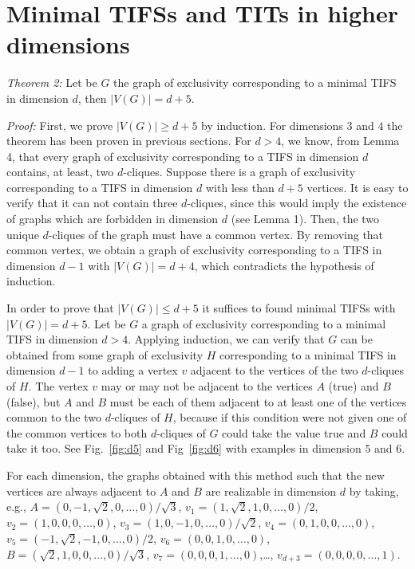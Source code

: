 \documentclass[%
 twocolumn,
 groupedaddress,
 showpacs,
 showkeys,
 preprintnumbers,
 amsmath,amssymb,
 aps,
 pra,
 longbibliography,
 floatfix,
 ]{revtex4-1}
\def\endproof{\vrule height6pt width6pt depth0pt}
\begin{document}

\section{Minimal TIFSs and TITs in higher dimensions}


{\em Theorem 2:} Let be $G$ the graph of exclusivity corresponding to a minimal TIFS in dimension $d$, then $|V(G)| = d+5$.


{\em Proof:} First, we prove $|V(G)| \geq d+5$ by induction. For dimensions $ 3 $ and $ 4 $ the theorem has been proven in previous sections. For $ d> 4 $, we know, from Lemma 4, that every graph of exclusivity corresponding to a TIFS in dimension $ d $ contains, at least, two $d$-cliques.
Suppose there is a graph of exclusivity corresponding to a TIFS in dimension $ d $ with less than $ d + 5 $ vertices. It is easy to verify that it can not contain
three $d$-cliques, since this would imply the existence of graphs which are forbidden in dimension $ d $ (see Lemma 1). Then, the two unique $d$-cliques of the graph must have a common vertex. By removing that common vertex, we obtain a graph of exclusivity corresponding to a TIFS in dimension $ d-1 $ with $ | V (G) | = d + 4 $, which contradicts the hypothesis of induction.

In order to prove that $|V(G)| \leq d+5$ it suffices to found minimal TIFSs with $ | V (G) | = d + 5 $.
Let be $ G $ a graph of exclusivity corresponding to a minimal TIFS in dimension $ d> 4 $.
Applying induction, we can verify that $ G $ can be obtained from some graph of exclusivity $ H $ corresponding to a minimal TIFS in dimension $ d-1 $ to adding a vertex $ v $ adjacent to the vertices of the two $d$-cliques of $ H $. The vertex $ v $ may or may not be adjacent to the vertices $ A $ (true) and $ B $ (false), but $ A $ and $ B $ must be each of them adjacent to at least one of the vertices common to the two $d$-cliques of $ H $, because if this condition were not given one of the common vertices to both $d$-cliques of $ G $ could take the value true and $ B $ could take it too. See Fig.~\ref{fig:d5} and Fig~\ref{fig:d6} with examples in dimension $ 5 $ and $ 6 $.

For each dimension, the graphs obtained with this method such that the new vertices are always adjacent to $A$ and $B$  are realizable in dimension $d$ by taking, e.g.,
		$A = ({0,-1,\sqrt{2},0,\dots,0} )/\sqrt{3}$,
		$v_1 = ({1,\sqrt{2},1,0,\dots,0} )/ 2 $,
		$v_2 = ({1,0,0,0,\dots,0} )$,
		$v_3 = ({1,0,-1,0,\dots,0} )/\sqrt{2}$,
		$v_4 = ({0,1,0,0,\dots,0} ) $,
		$v_5 = ({-1,\sqrt{2},-1,0,\dots,0} )/ 2$,
		$v_6 = ({0,0,1,0,\dots,0} ) $,
		$B = ({\sqrt{2},1,0,0,\dots,0} ) /\sqrt{3}$,
		$v_7 = ({0,0,0,1,\dots,0} )$,\dots,
		$v_{d+3} = ({0,0,0,0,\dots,1} )$.\hfill \endproof
\end{document}
